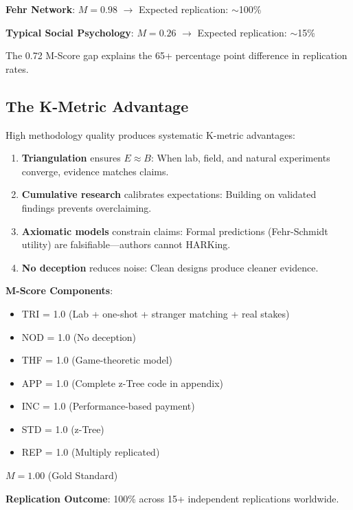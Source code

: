 \documentclass[11pt,a4paper]{article}
\theoremstyle{remark}
\begin{document}
\begin{resultbox}[title={M-Score Differential}]
\textbf{Fehr Network}: $M = 0.98$ $\rightarrow$ Expected replication: $\sim$100\%

\textbf{Typical Social Psychology}: $M = 0.26$ $\rightarrow$ Expected replication: $\sim$15\%

The 0.72 M-Score gap explains the 65+ percentage point difference in replication rates.
\end{resultbox}

\subsection{The K-Metric Advantage}

High methodology quality produces systematic K-metric advantages:

\begin{enumerate}
    \item \textbf{Triangulation} ensures $E \approx B$: When lab, field, and natural experiments converge, evidence matches claims.

    \item \textbf{Cumulative research} calibrates expectations: Building on validated findings prevents overclaiming.

    \item \textbf{Axiomatic models} constrain claims: Formal predictions (Fehr-Schmidt utility) are falsifiable---authors cannot HARKing.

    \item \textbf{No deception} reduces noise: Clean designs produce cleaner evidence.
\end{enumerate}

\begin{examplebox}[title={Fehr \& Gächter (2000): Altruistic Punishment}]
\textbf{M-Score Components}:
\begin{itemize}
    \item TRI = 1.0 (Lab + one-shot + stranger matching + real stakes)
    \item NOD = 1.0 (No deception)
    \item THF = 1.0 (Game-theoretic model)
    \item APP = 1.0 (Complete z-Tree code in appendix)
    \item INC = 1.0 (Performance-based payment)
    \item STD = 1.0 (z-Tree)
    \item REP = 1.0 (Multiply replicated)
\end{itemize}

$M = 1.00$ (Gold Standard)

\textbf{Replication Outcome}: 100\% across 15+ independent replications worldwide.
\end{examplebox}
\end{document}
